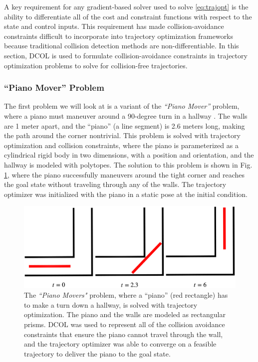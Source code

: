 A key requirement for any gradient-based solver used to solve \eqref{eq:trajopt} is the ability to differentiate all of the cost and constraint functions with respect to the state and control inputs. This requirement has made collision-avoidance constraints difficult to incorporate into trajectory optimization frameworks because traditional collision detection methods are non-differentiable. In this section, DCOL is used to formulate collision-avoidance constraints in trajectory optimization problems to solve for collision-free trajectories.
\subsubsection{``Piano Mover'' Problem}
The first problem we will look at is a variant of the \textit{``Piano Mover''} problem, where a piano must maneuver around a 90-degree turn in a hallway \cite{wilson2013,schwartz1983}. The walls are 1 meter apart, and the ``piano'' (a line segment) is 2.6 meters long, making the path around the corner nontrivial. This problem is solved with trajectory optimization and collision constraints, where the piano is parameterized as a cylindrical rigid body in two dimensions, with a position and orientation, and the hallway is modeled with polytopes. The solution to this problem is shown in Fig. \ref{fig:piano}, where the piano successfully maneuvers around the tight corner and reaches the goal state without traveling through any of the walls. The trajectory optimizer was initialized with the piano in a static pose at the initial condition.
\cite{wilson2013} \cite{schwartz1983}
\begin{figure}[t]
\centerline{\includegraphics[width = .95\columnwidth]{figures/piano_mover_v3.png}}
\caption{The \textit{``Piano Movers"} problem, where a ``piano'' (red rectangle) has to make a turn down a hallway, is solved with trajectory optimization. The piano and the walls are modeled as rectangular prisms. DCOL was used to represent all of the collision avoidance constraints that ensure the piano cannot travel through the wall, and the trajectory optimizer was able to converge on a feasible trajectory to deliver the piano to the goal state.}
\label{fig:piano}
\vspace{-10pt}
\end{figure}
